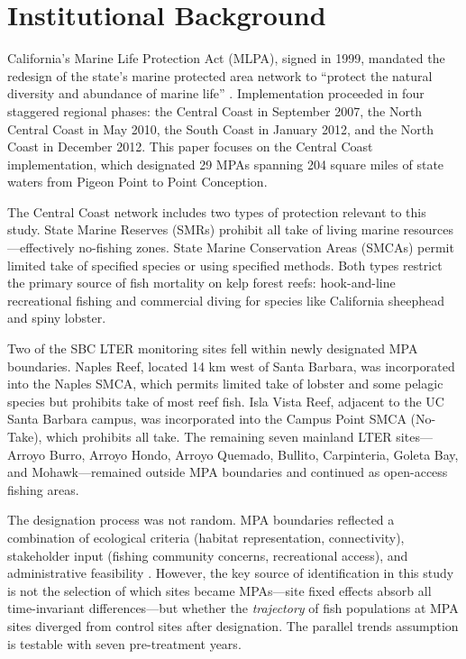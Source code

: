 \documentclass[12pt]{article}
\begin{document}
\section{Institutional Background}
\label{sec:background}

California's Marine Life Protection Act (MLPA), signed in 1999, mandated the redesign of the state's marine protected area network to ``protect the natural diversity and abundance of marine life'' \citep{mlpa1999}. Implementation proceeded in four staggered regional phases: the Central Coast in September 2007, the North Central Coast in May 2010, the South Coast in January 2012, and the North Coast in December 2012. This paper focuses on the Central Coast implementation, which designated 29 MPAs spanning 204 square miles of state waters from Pigeon Point to Point Conception.

The Central Coast network includes two types of protection relevant to this study. State Marine Reserves (SMRs) prohibit all take of living marine resources---effectively no-fishing zones. State Marine Conservation Areas (SMCAs) permit limited take of specified species or using specified methods. Both types restrict the primary source of fish mortality on kelp forest reefs: hook-and-line recreational fishing and commercial diving for species like California sheephead and spiny lobster.

Two of the SBC LTER monitoring sites fell within newly designated MPA boundaries. Naples Reef, located 14 km west of Santa Barbara, was incorporated into the Naples SMCA, which permits limited take of lobster and some pelagic species but prohibits take of most reef fish. Isla Vista Reef, adjacent to the UC Santa Barbara campus, was incorporated into the Campus Point SMCA (No-Take), which prohibits all take. The remaining seven mainland LTER sites---Arroyo Burro, Arroyo Hondo, Arroyo Quemado, Bullito, Carpinteria, Goleta Bay, and Mohawk---remained outside MPA boundaries and continued as open-access fishing areas.

The designation process was not random. MPA boundaries reflected a combination of ecological criteria (habitat representation, connectivity), stakeholder input (fishing community concerns, recreational access), and administrative feasibility \citep{saarman2013overview}. However, the key source of identification in this study is not the selection of which sites became MPAs---site fixed effects absorb all time-invariant differences---but whether the \textit{trajectory} of fish populations at MPA sites diverged from control sites after designation. The parallel trends assumption is testable with seven pre-treatment years.
\end{document}
